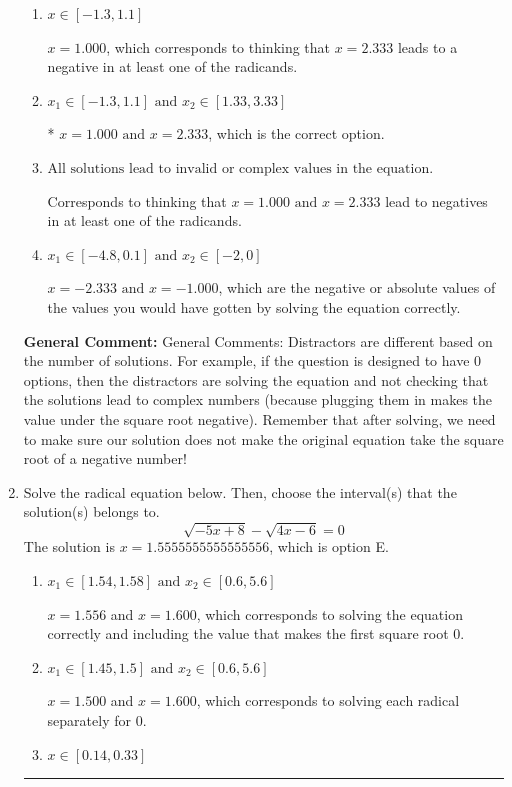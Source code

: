 \documentclass{extbook}[14pt]
\newcommand{\litem}[1]{\item #1

\rule{\textwidth}{0.4pt}}
\begin{document}
\begin{enumerate}
{\begin{enumerate}[label=\Alph*.]
$x = 2.333$, which corresponds to thinking that $x = 1.000$ leads to a negative in at least one of the radicands.
\item \( x \in [-1.3,1.1] \)

$x = 1.000$, which corresponds to thinking that $x = 2.333$ leads to a negative in at least one of the radicands.
\item \( x_1 \in [-1.3, 1.1] \text{ and } x_2 \in [1.33,3.33] \)

* $x = 1.000 \text{ and } x = 2.333$, which is the correct option.
\item \( \text{All solutions lead to invalid or complex values in the equation.} \)

Corresponds to thinking that $x = 1.000 \text{ and } x = 2.333$ lead to negatives in at least one of the radicands.
\item \( x_1 \in [-4.8, 0.1] \text{ and } x_2 \in [-2,0] \)

$x = -2.333 \text{ and } x = -1.000$, which are the negative or absolute values of the values you would have gotten by solving the equation correctly.
\end{enumerate}

\textbf{General Comment:} General Comments: Distractors are different based on the number of solutions. For example, if the question is designed to have 0 options, then the distractors are solving the equation and not checking that the solutions lead to complex numbers (because plugging them in makes the value under the square root negative). Remember that after solving, we need to make sure our solution does not make the original equation take the square root of a negative number!
}
\litem{
Solve the radical equation below. Then, choose the interval(s) that the solution(s) belongs to.
\[ \sqrt{-5 x + 8} - \sqrt{4 x - 6} = 0 \]
The solution is \( x = 1.5555555555555556 \), which is option E.\begin{enumerate}[label=\Alph*.]
\item \( x_1 \in [1.54, 1.58] \text{ and } x_2 \in [0.6,5.6] \)

$x = 1.556$ and $x = 1.600$, which corresponds to solving the equation correctly and including the value that makes the first square root 0.
\item \( x_1 \in [1.45, 1.5] \text{ and } x_2 \in [0.6,5.6] \)

$x = 1.500$ and $x = 1.600$, which corresponds to solving each radical separately for 0.
\item \( x \in [0.14,0.33] \)


\end{enumerate}}
\end{enumerate}
\end{document}
